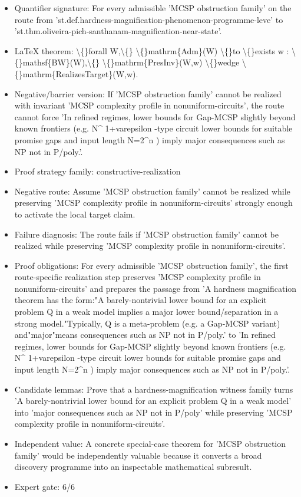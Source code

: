 \documentclass[11pt]{article}
\begin{document}
\begin{itemize}
\item Quantifier signature: For every admissible 'MCSP obstruction family' on the route from 'st.def.hardness-magnification-phenomenon-programme-leve' to 'st.thm.oliveira-pich-santhanam-magnification-near-state'.
\item LaTeX theorem: \textbackslash\{\}forall W,\textbackslash\{\} \textbackslash\{\}mathrm\{Adm\}(W) \textbackslash\{\}to \textbackslash\{\}exists w : \textbackslash\{\}mathsf\{BW\}(W),\textbackslash\{\} \textbackslash\{\}mathrm\{PresInv\}(W,w) \textbackslash\{\}wedge \textbackslash\{\}mathrm\{RealizesTarget\}(W,w).
\item Negative/barrier version: If 'MCSP obstruction family' cannot be realized with invariant 'MCSP complexity profile in nonuniform-circuits', the route cannot force 'In refined regimes, lower bounds for Gap-MCSP slightly beyond known frontiers (e.g. N\textasciicircum{} 1+varepsilon -type circuit lower bounds for suitable promise gaps and input length N=2\textasciicircum{}n ) imply major consequences such as NP not in P/poly.'.
\item Proof strategy family: constructive-realization
\item Negative route: Assume 'MCSP obstruction family' cannot be realized while preserving 'MCSP complexity profile in nonuniform-circuits' strongly enough to activate the local target claim.
\item Failure diagnosis: The route fails if 'MCSP obstruction family' cannot be realized while preserving 'MCSP complexity profile in nonuniform-circuits'.
\item Proof obligations: For every admissible 'MCSP obstruction family', the first route-specific realization step preserves 'MCSP complexity profile in nonuniform-circuits' and prepares the passage from 'A hardness magnification theorem has the form:"A barely-nontrivial lower bound for an explicit problem Q in a weak model implies a major lower bound/separation in a strong model."Typically, Q is a meta-problem (e.g. a Gap-MCSP variant) and"major"means consequences such as NP not in P/poly.' to 'In refined regimes, lower bounds for Gap-MCSP slightly beyond known frontiers (e.g. N\textasciicircum{} 1+varepsilon -type circuit lower bounds for suitable promise gaps and input length N=2\textasciicircum{}n ) imply major consequences such as NP not in P/poly.'.
\item Candidate lemmas: Prove that a hardness-magnification witness family turns 'A barely-nontrivial lower bound for an explicit problem Q in a weak model' into 'major consequences such as NP not in P/poly' while preserving 'MCSP complexity profile in nonuniform-circuits'.
\item Independent value: A concrete special-case theorem for 'MCSP obstruction family' would be independently valuable because it converts a broad discovery programme into an inspectable mathematical subresult.
\item Expert gate: 6/6
\end{itemize}
\end{document}
